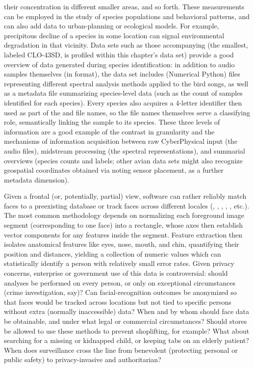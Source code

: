 {\begin{description}
their concentration in different smaller areas, and so forth.  
These measurements can be employed in the study of 
species populations and behavioral patterns, and can 
also add data to urban-planning or ecological models.  
For example, precipitous decline of a species in some 
location can signal environmental degradation in that vicinity.   
\pseudoIndent{}
Data sets such as those accompanying \cite{JustinSalamon} 
(the smallest, labeled CLO-43SD, is profiled within 
this chapter's data set)   
provide a good overview of data generated during 
species identification: in addition to audio 
samples themselves (in \WAV{} format), the data set 
includes \NPY{} (Numerical Python) files representing 
different spectral analysis methods applied 
to the bird songs, as well as a metadata file 
summarizing species-level data (such as the count 
of samples identified for each species).  
Every species also acquires a 4-letter identifier then used
as part of the \WAV{} and \NPY{} file names, so the 
file names themselves serve a classifying role, 
semantically linking the sample to its species.  
These three levels of information are a good 
example of the contrast in granularity 
\mdash{} and the mechanisms of information acquisition 
\mdash{} between raw CyberPhysical input (the audio files), midstream 
processing (the spectral representations), and 
summarial overviews (species counts and labels;   
other avian data sets might also recognize 
geospatial coordinates obtained via noting sensor placement, 
as a further metadata dimension).
 
\item[Facial Recognition]  Given a frontal (or, potentially, 
partial) view, software can 
rather reliably match faces to a preexisting database or 
track faces across different locales (\cite{WeiLunChao},
\cite{YueqiDuan}, \cite{GaryHuang}, 
\cite{KalaiselviNithya}, \cite{FengLu}, etc.).  
The most common methodology depends 
on normalizing each foreground image segment (corresponding to 
one face) into a rectangle, whose axes then establish vector 
components for any features inside the segment.  Feature extraction 
then isolates anatomical features like eyes, nose, mouth, and 
chin, quantifying their position and distances, yielding a 
collection of numeric values which can statistically 
identify a person with relatively small error rates.  
\pseudoIndent{}
Given privacy concerns, enterprise or government use 
of this data is controversial: should analyses be performed 
on every person, or only on exceptional circumstances 
(crime investigation, say)?  Can facial-recognition outcomes 
be anonymized so that faces would be tracked across locations 
but not tied to specific persons without extra (normally 
inaccessible) data?  When and by whom should face data be 
obtainable, and under what legal or commercial circumstances?  
Should stores be allowed to use these methods to 
prevent shoplifting, for example?  What about searching 
for a missing or kidnapped child, or keeping tabs on an 
elderly patient?  When does surveillance cross the line 
from benevolent (protecting personal or public safety) 
to privacy-invasive and authoritarian?
\end{description}
}
